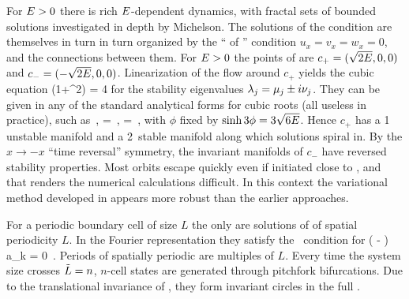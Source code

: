 For $E>0$ there is rich
$E$-dependent dynamics, with
fractal sets of bounded solutions investigated in
depth by Michelson.
The solutions of the {\eqv}  condition
 are themselves in turn  in turn organized by the
``{\eqva}  of {\eqva}''  condition
\( u_x= v_x= w_x= 0 \), and
the connections between them.
    For $E>0$ the {\eqv}  points of  are
$c_{+}=(\sqrt{2E},0,0)$ and $c_{-}=(-\sqrt{2E},0,0)$.
Linearization of the flow around
$c_{+}$ yields the cubic equation
  \beq
\eigExp(1+\eigExp^2) = 4 \expctE
for the
stability eigenvalues
$\eigExp[j] = \eigRe[j] \pm i \eigIm[j]$.
They can
be given in any of the standard analytical forms for cubic
roots  (all useless in practice), such as
    \,,\qquad
\eigRe=\sinh \phi
\,,\qquad
\eigIm=\cosh \phi \, ,
with $\phi$ fixed by $\sinh 3\phi=3\sqrt{6\expctE}$.
Hence $c_{+}$ has a {1\dmn}
unstable manifold and a 2\dmn\ stable manifold
along which solutions spiral in.
By the $x \to -x$ ``time reversal'' symmetry, the
invariant manifolds of $c_{-}$
have reversed stability properties.
Most orbits escape quickly even if initiated close to \eqva, and that
renders the numerical calculations
difficult.
In this context the variational method
developed in 
appears more robust than
the earlier approaches.


%
For a periodic boundary cell of size
$L$ the only {\eqva}  are
solutions of  of spatial periodicity $L$.
In the Fourier representation they satisfy
the \eqv\ condition for 
\beq
\left(  -   \right)\, a_k
  = 0
\,.
\label{eq:stfks}
\eeq
Periods of spatially periodic {\eqva} are multiples of $L$.
Every time the system size crosses  $\tilde{L}=n$,
$n$-cell states
are generated through pitchfork bifurcations.
Due to the translational invariance of {\KSe},
they form invariant circles
in the full \statesp.

